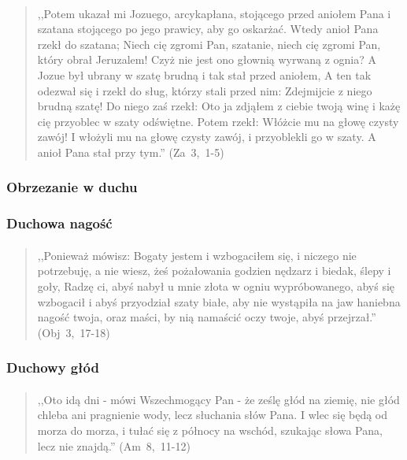 \documentclass[10pt,a4paper,oneside]{article}
\begin{document}
\paragraph{}
\begin{quote}
,,Potem ukazał mi Jozuego, arcykapłana, stojącego przed aniołem Pana i szatana stojącego po jego prawicy, aby go oskarżać. Wtedy anioł Pana rzekł do szatana; Niech cię zgromi Pan, szatanie, niech cię zgromi Pan, który obrał Jeruzalem! Czyż nie jest ono głownią wyrwaną z ognia? A Jozue był ubrany w szatę brudną i tak stał przed aniołem, A ten tak odezwał się i rzekł do sług, którzy stali przed nim: Zdejmijcie z niego brudną szatę! Do niego zaś rzekł: Oto ja zdjąłem z ciebie twoją winę i każę cię przyoblec w szaty odświętne. Potem rzekł: Włóżcie mu na głowę czysty zawój! I włożyli mu na głowę czysty zawój, i przyoblekli go w szaty. A anioł Pana stał przy tym.'' \mbox{(Za 3, 1-5)}
\end{quote}
\subsubsection{Obrzezanie w duchu}
\subsubsection{Duchowa nagość}
\paragraph{}
\begin{quote}
,,Ponieważ mówisz: Bogaty jestem i wzbogaciłem się, i niczego nie potrzebuję, a nie wiesz, żeś pożałowania godzien nędzarz i biedak, ślepy i goły, Radzę ci, abyś nabył u mnie złota w ogniu wypróbowanego, abyś się wzbogacił i abyś przyodział szaty białe, aby nie wystąpiła na jaw haniebna nagość twoja, oraz maści, by nią namaścić oczy twoje, abyś przejrzał.'' \mbox{(Obj 3, 17-18)}
\end{quote}
\subsubsection{Duchowy głód}
\paragraph{}
\begin{quote}
,,Oto idą dni - mówi Wszechmogący Pan - że ześlę głód na ziemię, nie głód chleba ani pragnienie wody, lecz słuchania słów Pana. I wlec się będą od morza do morza, i tułać się z północy na wschód, szukając słowa Pana, lecz nie znajdą.'' \mbox{(Am 8, 11-12)}
\end{quote}
\end{document}
